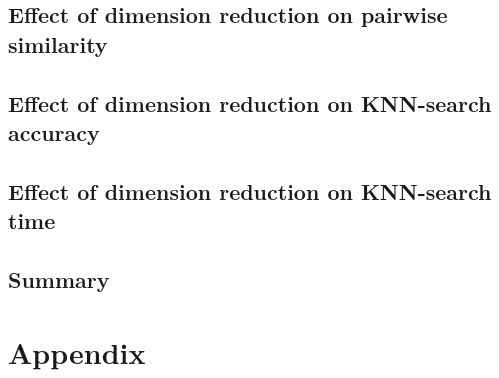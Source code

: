 \documentclass{report}
\begin{document}
\section{Effect of dimension reduction on pairwise similarity}


\section{Effect of dimension reduction on KNN-search accuracy}


\section{Effect of dimension reduction on KNN-search time}


\section{Summary}


\appendix
\appendixchapterformat
\chapter{Appendix} \label{ch:appendix}


\printbibliography
\end{document}
